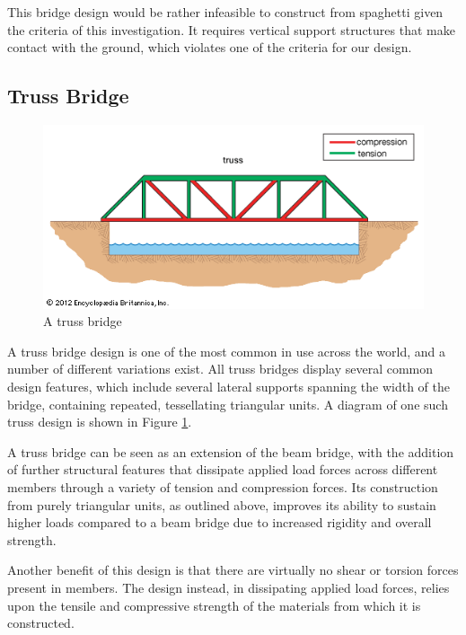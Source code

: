 \documentclass[a4paper,11pt]{article}
\begin{document}
This bridge design would be rather infeasible to construct from spaghetti given
the criteria of this investigation.
It requires vertical support structures that make contact with the ground,
which violates one of the criteria for our design.


\subsection{Truss Bridge}

\begin{figure}
\begin{center}
\includegraphics[width=\textwidth]{figures/truss.png}
\end{center}
\caption{A truss bridge}
\label{research:truss}
\end{figure}

A truss bridge design is one of the most common in use across the world, and a
number of different variations exist.
All truss bridges display several common design features, which include
several lateral supports spanning the width of the bridge, containing repeated,
tessellating triangular units.
A diagram of one such truss design is shown in Figure \ref{research:truss}.

A truss bridge can be seen as an extension of the beam bridge, with the addition
of further structural features that dissipate applied load forces across
different members through a variety of tension and compression forces.
Its construction from purely triangular units, as outlined above, improves its
ability to sustain higher loads compared to a beam bridge due to increased
rigidity and overall strength.

Another benefit of this design is that there are virtually no shear or torsion
forces present in members.
The design instead, in dissipating applied load forces, relies upon the tensile
and compressive strength of the materials from which it is constructed.
\end{document}
